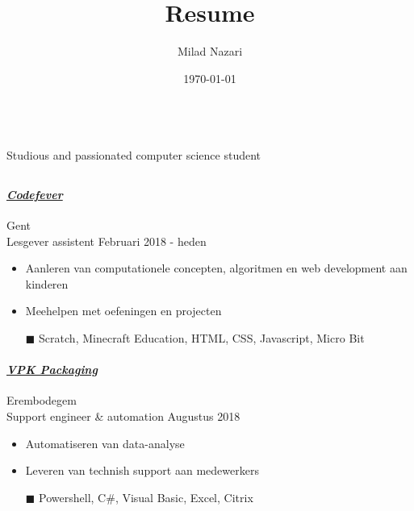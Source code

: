 \documentclass[a4paper, twoside]{article}
\title{Resume}
\author{Milad Nazari}
\date{\today}
\begin{document}
\begin{multicols}{2}
    \\
    \noindent Studious and passionated computer science student
    \paragraph{}
    \hfill{}\par
    \hfill{}\par    
    \hfill{}\par
\end{multicols}

\begin{mdframed}
\section*{\textcolor{white}{}}
\end{mdframed}

\paragraph{\textbf{\textit{\href{https://codefever.be}{\textcolor{blueDark}{Codefever}}}}} \hfill\small Gent \\
Lesgever assistent \hfill\small Februari 2018 - heden
\begin{itemize}
    \itemsep-0.2em 
    \item Aanleren van computationele concepten, algoritmen en web development aan kinderen
    \item Meehelpen met oefeningen en projecten
    \item[\color{orange}$\blacksquare$] Scratch, Minecraft Education, HTML, CSS, Javascript, Micro Bit
\end{itemize}

\paragraph{\textbf{\textit{\href{https://vpkgroup.com/}{\textcolor{blueDark}{VPK Packaging}}}}} \hfill\small Erembodegem\\
Support engineer \& automation \hfill\small Augustus 2018
\begin{itemize}
    \itemsep-0.2em 
    \item Automatiseren van data-analyse
    \item Leveren van technish support aan medewerkers
    \item[\color{orange}$\blacksquare$] Powershell, C\#, Visual Basic, Excel, Citrix
\end{itemize}
\end{document}
